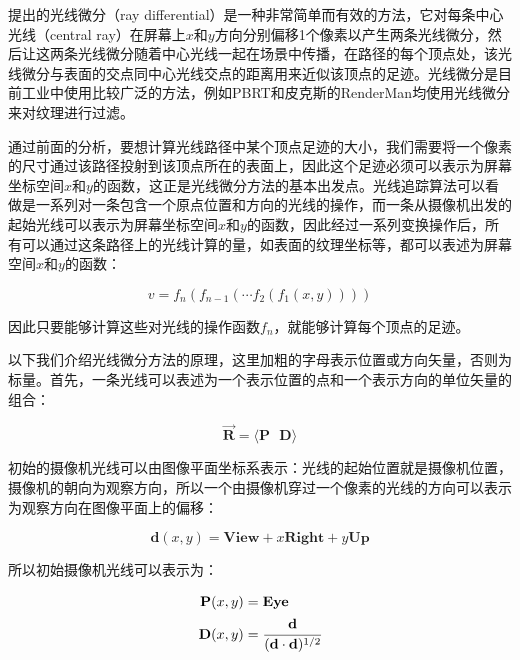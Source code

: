 \cite{a:TracingRayDifferentials}提出的光线微分（ray differential）是一种非常简单而有效的方法，它对每条中心光线（central ray）在屏幕上$x$和$y$方向分别偏移1个像素以产生两条光线微分，然后让这两条光线微分随着中心光线一起在场景中传播，在路径的每个顶点处，该光线微分与表面的交点同中心光线交点的距离用来近似该顶点的足迹。光线微分是目前工业中使用比较广泛的方法，例如PBRT\cite{b:pbrt}和皮克斯的RenderMan\cite{a:RayDifferentialsandMultiresolutionGeometryCachingforDistributionRayTracinginComplexScenes}均使用光线微分来对纹理进行过滤。

通过前面的分析，要想计算光线路径中某个顶点足迹的大小，我们需要将一个像素的尺寸通过该路径投射到该顶点所在的表面上，因此这个足迹必须可以表示为屏幕坐标空间$x$和$y$的函数，这正是光线微分方法的基本出发点。光线追踪算法可以看做是一系列对一条包含一个原点位置和方向的光线的操作，而一条从摄像机出发的起始光线可以表示为屏幕坐标空间$x$和$y$的函数，因此经过一系列变换操作后，所有可以通过这条路径上的光线计算的量，如表面的纹理坐标等，都可以表述为屏幕空间$x$和$y$的函数：

\begin{equation}
	v=f_n(f_{n-1}(\cdots f_2(f_1(x,y))))
\end{equation}

\noindent 因此只要能够计算这些对光线的操作函数$f_n$，就能够计算每个顶点的足迹。

以下我们介绍光线微分方法的原理，这里加粗的字母表示位置或方向矢量，否则为标量。首先，一条光线可以表述为一个表示位置的点和一个表示方向的单位矢量的组合：

\begin{equation}
	\overrightarrow{\mathbf{R}}=\langle \mathbf{P} \text{ }\mathbf{D}\rangle
\end{equation}

\noindent 初始的摄像机光线可以由图像平面坐标系表示：光线的起始位置就是摄像机位置，摄像机的朝向为观察方向，所以一个由摄像机穿过一个像素的光线的方向可以表示为观察方向在图像平面上的偏移：

\begin{equation}
	\mathbf{d}(x,y)=\mathbf{View}+x\mathbf{Right}+y\mathbf{Up}
\end{equation}

\noindent 所以初始摄像机光线可以表示为：

\begin{equation}
	\begin{aligned}
		\mathbf{P}(x,y)&=\mathbf{Eye}\\
		\mathbf{D}(x,y)&= \cfrac{\mathbf{d}}{(\mathbf{d}\cdot \mathbf{d})^{1/2}}
	\end{aligned}
\end{equation}

